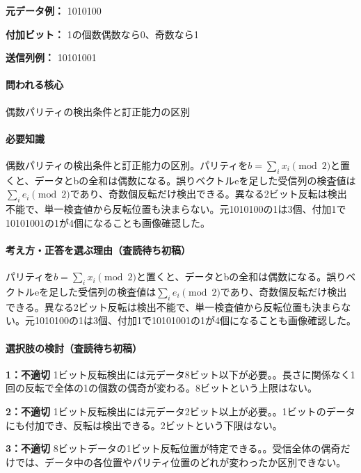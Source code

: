\noindent\textbf{元データ例：} 1010100\par

\noindent\textbf{付加ビット：} 1の個数偶数なら0、奇数なら1\par

\noindent\textbf{送信列例：} 10101001\par

\paragraph{問われる核心} 偶数パリティの検出条件と訂正能力の区別

\paragraph{必要知識} 偶数パリティの検出条件と訂正能力の区別。パリティを\(b=\sum_ix_i\pmod2\)と置くと、データとbの全和は偶数になる。誤りベクトルeを足した受信列の検査値は\(\sum_ie_i\pmod2\)であり、奇数個反転だけ検出できる。異なる2ビット反転は検出不能で、単一検査値から反転位置も決まらない。元1010100の1は3個、付加1で10101001の1が4個になることも画像確認した。

\paragraph{考え方・正答を選ぶ理由（査読待ち初稿）} パリティを\(b=\sum_ix_i\pmod2\)と置くと、データとbの全和は偶数になる。誤りベクトルeを足した受信列の検査値は\(\sum_ie_i\pmod2\)であり、奇数個反転だけ検出できる。異なる2ビット反転は検出不能で、単一検査値から反転位置も決まらない。元1010100の1は3個、付加1で10101001の1が4個になることも画像確認した。

\paragraph{選択肢の検討（査読待ち初稿）}\mbox{}\par

\noindent\textbf{1：不適切} 1ビット反転検出には元データ8ビット以下が必要。。長さに関係なく1回の反転で全体の1の個数の偶奇が変わる。8ビットという上限はない。\par

\noindent\textbf{2：不適切} 1ビット反転検出には元データ2ビット以上が必要。。1ビットのデータにも付加でき、反転は検出できる。2ビットという下限はない。\par

\noindent\textbf{3：不適切} 8ビットデータの1ビット反転位置が特定できる。。受信全体の偶奇だけでは、データ中の各位置やパリティ位置のどれが変わったか区別できない。\par

